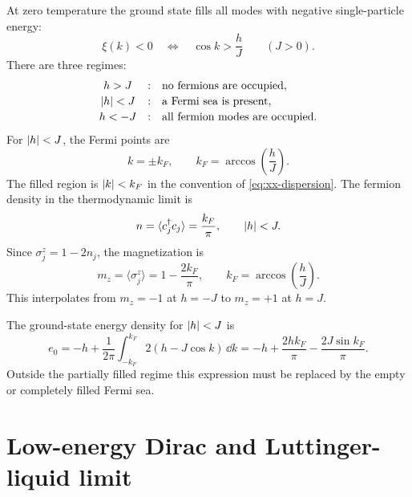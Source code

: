 At zero temperature the ground state fills all modes with negative
single-particle energy:
\begin{equation}
\label{eq:xx-fill-negative-energy}
    \xi(k)<0
    \quad\Longleftrightarrow\quad
    \cos k>\frac{h}{J}
    \qquad (J>0).
\end{equation}
There are three regimes:
\begin{equation}
\label{eq:xx-ground-state-regimes}
\begin{array}{ccl}
    h>J &:& \text{no fermions are occupied},\\[2pt]
    \left|h\right|<J &:& \text{a Fermi sea is present},\\[2pt]
    h<-J &:& \text{all fermion modes are occupied}.
\end{array}
\end{equation}
For $\left|h\right|<J$, the Fermi points are
\begin{equation}
\label{eq:xx-fermi-momentum}
    k=\pm k_F,
    \qquad
    k_F=\arccos\left(\frac{h}{J}\right).
\end{equation}
The filled region is $\left|k\right|<k_F$ in the convention of
\cref{eq:xx-dispersion}.  The fermion density in the thermodynamic limit is
\begin{equation}
\label{eq:xx-fermion-density}
    n
    =
    \langle c_j^\dagger c_j\rangle
    =
    \frac{k_F}{\pi},
    \qquad
    \left|h\right|<J.
\end{equation}
Since $\sigma_j^z=1-2n_j$, the magnetization is
\begin{equation}
\label{eq:xx-z-magnetization}
    m_z
    =
    \langle \sigma_j^z\rangle
    =
    1-\frac{2k_F}{\pi},
    \qquad
    k_F=\arccos\left(\frac{h}{J}\right).
\end{equation}
This interpolates from $m_z=-1$ at $h=-J$ to $m_z=+1$ at $h=J$.

The ground-state energy density for $\left|h\right|<J$ is
\begin{equation}
\label{eq:xx-ground-state-energy-density}
    e_0
    =
    -h+
    \frac{1}{2\pi}
    \int_{-k_F}^{k_F}2(h-J\cos k)\,\dd k
    =
    -h+
    \frac{2hk_F}{\pi}
    -
    \frac{2J\sin k_F}{\pi}.
\end{equation}
Outside the partially filled regime this expression must be replaced by the
empty or completely filled Fermi sea.

\section{Low-energy Dirac and Luttinger-liquid limit}
\label{sec:xx-low-energy-limit}


